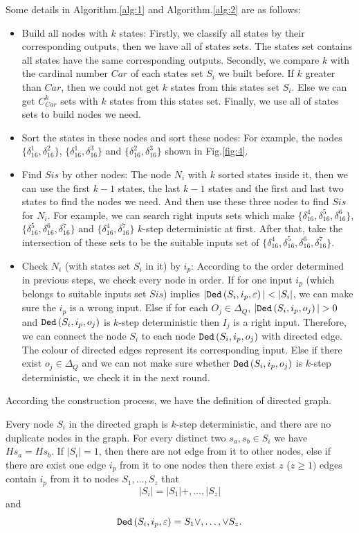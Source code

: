 Some details in Algorithm.\ref{alg:1} and Algorithm.\ref{alg:2} are as follows:
\begin{itemize}
\item Build all nodes with $k$ states: Firstly, we classify all states by their corresponding outputs, then we have all of states sets. The states set contains all states have the same corresponding outputs. Secondly, we compare $k$ with the cardinal number $Car$ of each states set $S_i$ we built before. If $k$ greater than $Car$, then we could not get $k$ states from this states set $S_i$. Else we can get $C_{Car}^k$ sets with $k$ states from this states set. Finally, we use all of states sets to build nodes we need. 
 \item Sort the states in these nodes and sort these nodes: For example, the nodes $\{\delta_{16}^1,\delta_{16}^2\}$, $\{\delta_{16}^1,\delta_{16}^3\}$ and $\{\delta_{16}^2,\delta_{16}^3\}$ shown in Fig.\ref{fig:4}. 
  \item Find $Sis$ by other nodes: The node $N_i$ with $k$ sorted states inside it, then we can use the first $k-1$ states, the last $k-1$ states and the first and last two states to find the nodes we need. And then use these three nodes to find $Sis$ for $N_i$. For example, we can search right inputs sets which make $\{\delta_{16}^4,\delta_{16}^5,\delta_{16}^6\}$, $\{\delta_{16}^5,\delta_{16}^6,\delta_{16}^7\}$ and $\{\delta_{16}^4,\delta_{16}^7\}$ $k$-step deterministic at first. After that, take the intersection of these sets to be the suitable inputs set of $\{\delta_{16}^4,\delta_{16}^5,\delta_{16}^6,\delta_{16}^7\}$. 
  \item Check $N_i$ (with states set $S_i$ in it) by $i_p$: According to the order determined in previous steps, we check every node in order. If for one input $i_p$ (which belongs to suitable inputs set $Sis$) implies $|\Ded\left(S_i,i_p,\varepsilon\right)|<|S_i|$, we can make sure the $i_p$ is a wrong input. Else if for each $O_j \in \Delta_Q$, $|\Ded\left(S_i,i_p,o_j\right)|>0$ and ${\tt Ded}\left(S_i,i_p,o_j\right)$ is $k$-step deterministic then $I_j$ is a right input. Therefore, we can connect the node $S_i$ to each node ${\tt Ded}\left(S_i,i_p,o_j\right)$ with directed edge. The colour of directed edges represent its corresponding input. Else if there exist $o_j \in \Delta_Q$ and we can not make sure whether ${\tt Ded}\left(S_i,i_p,o_j\right)$ is $k$-step deterministic, we check it in the next round. 
\end{itemize} 

According the construction process, we have the definition of directed graph.
\begin{definition}
Every node $S_i$ in the directed graph is $k$-step deterministic, and there are no duplicate nodes in the graph. For every distinct two $s_a, s_b \in S_i$ we have $Hs_a=Hs_b$. If $|S_i|=1$, then there are not edge from it to other nodes, else if there are exist one edge $i_p$ from it to one nodes then there exist $z$ ($z\ge 1)$ edges contain $i_p$ from it to nodes $S_1,\ldots,S_z$ that \[|S_i|= |S_1|+,\ldots,|S_z|\] and \[{\tt Ded}\left(S_i,i_p,\varepsilon\right)=S_1\vee,\ldots,\vee S_z.\]
\end{definition}

